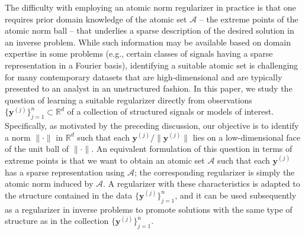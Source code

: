 \documentclass[11pt,letterpaper]{article}
\newcommand{\R}{\mathbb{R}}
\newcommand{\A}{\mathcal{A}}
\newcommand{\by}{\mathbf{y}}
\begin{document}
%

The difficulty with employing an atomic norm regularizer in practice is that one requires prior domain knowledge of the atomic set $\A$ -- the extreme points of the atomic norm ball -- that underlies a sparse description of the desired solution in an inverse problem.  While such information may be available based on domain expertise in some problems (e.g., certain classes of signals having a sparse representation in a Fourier basis), identifying a suitable atomic set is challenging for many contemporary datasets that are high-dimensional and are typically presented to an analyst in an unstructured fashion.  In this paper, we study the question of learning a suitable regularizer directly from observations $\{\by^{(j)}\}_{j=1}^n \subset \R^d$ of a collection of structured signals or models of interest.  Specifically, as motivated by the preceding discussion, our objective is to identify a norm $\|\cdot\|$ in $\R^d$ such that each $\by^{(j)} / \|\by^{(j)}\|$ lies on a low-dimensional face of the unit ball of $\|\cdot\|$.  An equivalent formulation of this question in terms of extreme points is that we want to obtain an atomic set $\A$ such that each $\by^{(j)}$ has a sparse representation using $\A$; the corresponding regularizer is simply the atomic norm induced by $\A$.  A regularizer with these characteristics is adapted to the structure contained in the data $\{\by^{(j)}\}_{j=1}^n$, and it can be used subsequently as a regularizer in inverse problems to promote solutions with the same type of structure as in the collection $\{\by^{(j)}\}_{j=1}^n$.
\end{document}
